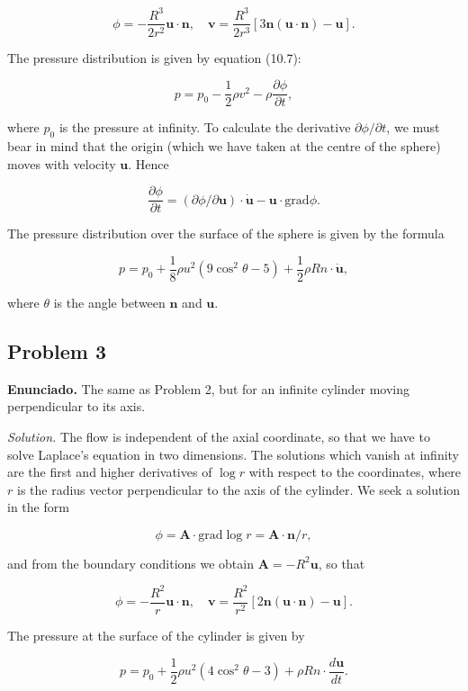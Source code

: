 \documentclass{article}
\begin{document}
$$
\phi = -\frac{R^3}{2r^2} \mathbf{u} \cdot \mathbf{n}, \quad \mathbf{v} = \frac{R^3}{2r^3} [3\mathbf{n}(\mathbf{u} \cdot \mathbf{n}) - \mathbf{u}].
$$

The pressure distribution is given by equation (10.7):

$$
p = p_0 - \frac{1}{2} \rho v^2 - \rho \frac{\partial \phi}{\partial t},
$$

where $p_0$ is the pressure at infinity. To calculate the derivative $\partial \phi/\partial t$, we must bear in mind that the origin (which we have taken at the centre of the sphere) moves with velocity $\mathbf{u}$. Hence

$$
\frac{\partial \phi}{\partial t} = (\partial \phi/\partial \mathbf{u}) \cdot \dot{\mathbf{u}} - \mathbf{u} \cdot \text{grad} \phi.
$$

The pressure distribution over the surface of the sphere is given by the formula

$$
p = p_0 + \frac{1}{8} \rho u^2 (9 \cos^2 \theta - 5) + \frac{1}{2} \rho R n \cdot \dot{\mathbf{u}},
$$

where $\theta$ is the angle between $\mathbf{n}$ and $\mathbf{u}$.

\subsection*{Problem 3}

\textbf{Enunciado.} The same as Problem 2, but for an infinite cylinder moving perpendicular to its axis.

\textit{Solution.} The flow is independent of the axial coordinate, so that we have to solve Laplace's equation in two dimensions. The solutions which vanish at infinity are the first and higher derivatives of $\log r$ with respect to the coordinates, where $r$ is the radius vector perpendicular to the axis of the cylinder. We seek a solution in the form

$$
\phi = \mathbf{A} \cdot \text{grad} \log r = \mathbf{A} \cdot \mathbf{n}/r,
$$

and from the boundary conditions we obtain $\mathbf{A} = -R^2 \mathbf{u}$, so that

$$
\phi = -\frac{R^2}{r} \mathbf{u} \cdot \mathbf{n}, \quad \mathbf{v} = \frac{R^2}{r^2} [2\mathbf{n}(\mathbf{u} \cdot \mathbf{n}) - \mathbf{u}].
$$

The pressure at the surface of the cylinder is given by

$$
p = p_0 + \frac{1}{2} \rho u^2 (4 \cos^2 \theta - 3) + \rho R n \cdot \frac{d\mathbf{u}}{dt}.
$$
\end{document}
